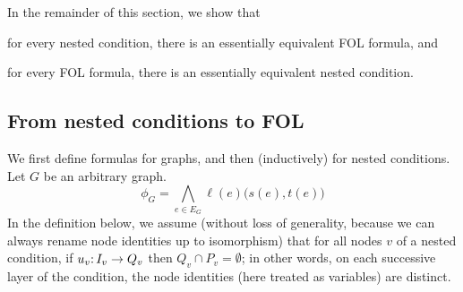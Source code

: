 In the remainder of this section, we show that
%
\begin{inumerate}
\item for every nested condition, there is an essentially equivalent FOL formula, and
\item for every FOL formula, there is an essentially equivalent nested condition.
\end{inumerate}
%
\subsection{From nested conditions to FOL}

We first define formulas for graphs, and then (inductively) for nested conditions. Let $G$ be an arbitrary graph.
%
\[ \phi_G = \textstyle
 \bigwedge_{e\in E_G} \ell(e)\bigl(s(e),t(e)\bigr)
\]
%
In the definition below, we assume (without loss of generality, because we can always rename node identities up to isomorphism) that for all nodes $v$ of a nested condition, if $u_v{:}\, I_v\rightarrow Q_v$ then $Q_v\cap P_v=\emptyset$; in other words, on each successive layer of the condition, the node identities (here treated as variables) are distinct. 

